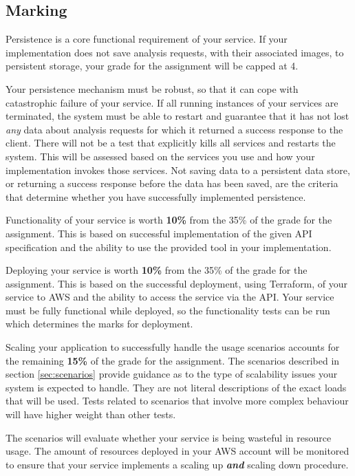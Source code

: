 \documentclass{csse4400}
\begin{document}
\subsection{Marking}
Persistence is a core functional requirement of your service.
If your implementation does not save analysis requests, with their associated images,
to persistent storage, your grade for the assignment will be capped at 4.

Your persistence mechanism must be robust, so that it can cope with catastrophic failure of your service.
If all running instances of your services are terminated,
the system must be able to restart and guarantee that it has not lost \textit{any} data
about analysis requests for which it returned a success response to the client.
There will not be a test that explicitly kills all services and restarts the system.
This will be assessed based on the services you use and how your implementation invokes those services.
Not saving data to a persistent data store, or returning a success response before the data has been saved,
are the criteria that determine whether you have successfully implemented persistence.

Functionality of your service is worth \textbf{10\%} from the 35\% of the grade for the assignment.
This is based on successful implementation of the given API specification
and the ability to use the provided tool in your implementation.

Deploying your service is worth \textbf{10\%} from the 35\% of the grade for the assignment.
This is based on the successful deployment, using Terraform,
of your service to AWS and the ability to access the service via the API.
Your service must be fully functional while deployed,
so the functionality tests can be run which determines the marks for deployment.

Scaling your application to successfully handle the usage scenarios accounts for the remaining \textbf{15\%}
of the grade for the assignment.
The scenarios described in section \ref{sec:scenarios} provide guidance
as to the type of scalability issues your system is expected to handle.
They are not literal descriptions of the exact loads that will be used.
Tests related to scenarios that involve more complex behaviour will have higher weight than other tests.

The scenarios will evaluate whether your service is being wasteful in resource usage.
The amount of resources deployed in your AWS account will be monitored to ensure that
your service implements a scaling up \textbf{\emph{and}} scaling down procedure.
\end{document}
